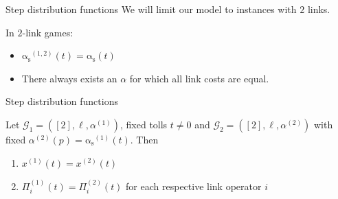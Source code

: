 \documentclass[handout]{beamer}
\newcommand{\as}{\mathrm{\alpha_s}}
\newcommand{\Gm}{\mathcal{G}}
\begin{document}
\begin{frame}{Step distribution functions}
	We will limit our model to instances with $2$ links.

	In $2$-link games:
	\begin{itemize}
		\item $\as^{(1, 2)}(t) = \as(t)$
		\item There always exists an $\alpha$ for which all link costs are equal.
	\end{itemize}
\end{frame}

\begin{frame}{Step distribution functions}
	\begin{lemma}
		Let $\Gm_1 = ([2], \ell, \alpha^{(1)})$, fixed tolls $t \ne 0$ and $\Gm_2 = ([2], \ell, \alpha^{(2)})$ with fixed $\alpha^{(2)}(p) = \as^{(1)}(t)$.
		Then
		\begin{enumerate}[$(i)$]
			\item $x^{(1)}(t) = x^{(2)}(t)$
			\item $\Pi_i^{(1)}(t) = \Pi_i^{(2)}(t)$ for each respective link operator $i$
		\end{enumerate}
	\end{lemma}
\end{frame}
\end{document}

